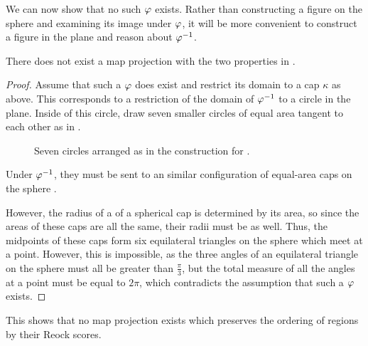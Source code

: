 We can now show that no such $\varphi$ exists.  Rather than constructing a figure on the sphere and examining its image under $\varphi$, it will be more convenient to construct a figure in the plane and reason about $\varphi^{-1}$.

\begin{theorem}\label{thm:reockbad}
  There does not exist a map projection with the two properties in
  .  
\end{theorem}
\begin{proof}

  Assume that such a $\varphi$ does exist and restrict its domain to
  a cap $\kappa$ as above.  This corresponds to a restriction of the
  domain of $\varphi^{-1}$ to a circle in the plane.  Inside of this
  circle, draw seven smaller circles of equal area tangent to each
  other as in .

  \begin{figure}[!htb]
    
    \centering
    
    \caption{Seven circles arranged as in the construction for .}
    \label{fig:sevencircles}
  \end{figure}	

  Under $\varphi^{-1}$, they must be sent to an similar configuration 
  of equal-area caps on the sphere .  

  However, the radius of a
  of a spherical cap is determined by its area, so since the areas of
  these caps are all the same, their radii must be as well. Thus, 
  the midpoints of these caps form six equilateral triangles on the sphere
  which meet at a point.  However, this is impossible, as the three 
  angles of an equilateral triangle on the sphere must all be greater
  than $\tfrac{\pi}{3}$, but the total measure of all the angles at
  a point must be equal to
  $2\pi$, which contradicts the assumption that such a $\varphi$ exists.
\end{proof}

This shows that no map projection exists which preserves the ordering of regions by their Reock scores.
